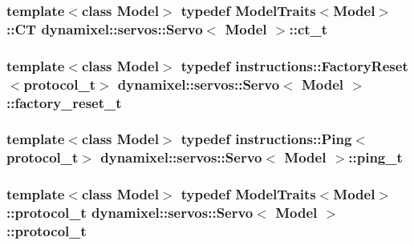 \subsubsection[{\texorpdfstring{ct\+\_\+t}{ct_t}}]{\setlength{\rightskip}{0pt plus 5cm}template$<$class Model$>$ typedef {\bf Model\+Traits}$<$Model$>$\+::CT {\bf dynamixel\+::servos\+::\+Servo}$<$ Model $>$\+::{\bf ct\+\_\+t}}\hypertarget{classdynamixel_1_1servos_1_1_servo_a882738edc68b4e641e066954f59896d3}{}\label{classdynamixel_1_1servos_1_1_servo_a882738edc68b4e641e066954f59896d3}
\subsubsection[{\texorpdfstring{factory\+\_\+reset\+\_\+t}{factory_reset_t}}]{\setlength{\rightskip}{0pt plus 5cm}template$<$class Model$>$ typedef {\bf instructions\+::\+Factory\+Reset}$<${\bf protocol\+\_\+t}$>$ {\bf dynamixel\+::servos\+::\+Servo}$<$ Model $>$\+::{\bf factory\+\_\+reset\+\_\+t}}\hypertarget{classdynamixel_1_1servos_1_1_servo_abbf04a51c076bfbf234179bb59fd45a2}{}\label{classdynamixel_1_1servos_1_1_servo_abbf04a51c076bfbf234179bb59fd45a2}
\subsubsection[{\texorpdfstring{ping\+\_\+t}{ping_t}}]{\setlength{\rightskip}{0pt plus 5cm}template$<$class Model$>$ typedef {\bf instructions\+::\+Ping}$<${\bf protocol\+\_\+t}$>$ {\bf dynamixel\+::servos\+::\+Servo}$<$ Model $>$\+::{\bf ping\+\_\+t}}\hypertarget{classdynamixel_1_1servos_1_1_servo_ae6ffa69927b65a1b73a52e80bcd07859}{}\label{classdynamixel_1_1servos_1_1_servo_ae6ffa69927b65a1b73a52e80bcd07859}
\subsubsection[{\texorpdfstring{protocol\+\_\+t}{protocol_t}}]{\setlength{\rightskip}{0pt plus 5cm}template$<$class Model$>$ typedef {\bf Model\+Traits}$<$Model$>$\+::{\bf protocol\+\_\+t} {\bf dynamixel\+::servos\+::\+Servo}$<$ Model $>$\+::{\bf protocol\+\_\+t}}\hypertarget{classdynamixel_1_1servos_1_1_servo_a7718c41cee1187b992836f4b6bad8a38}{}\label{classdynamixel_1_1servos_1_1_servo_a7718c41cee1187b992836f4b6bad8a38}
